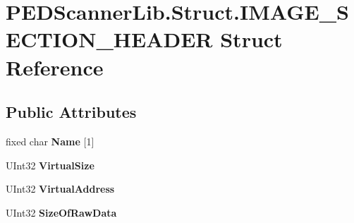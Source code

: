\hypertarget{struct_p_e_d_scanner_lib_1_1_struct_1_1_i_m_a_g_e___s_e_c_t_i_o_n___h_e_a_d_e_r}{}\section{P\+E\+D\+Scanner\+Lib.\+Struct.\+I\+M\+A\+G\+E\+\_\+\+S\+E\+C\+T\+I\+O\+N\+\_\+\+H\+E\+A\+D\+ER Struct Reference}
\label{struct_p_e_d_scanner_lib_1_1_struct_1_1_i_m_a_g_e___s_e_c_t_i_o_n___h_e_a_d_e_r}
\subsection*{Public Attributes}
\begin{DoxyCompactItemize}
\item 
\mbox{\label{struct_p_e_d_scanner_lib_1_1_struct_1_1_i_m_a_g_e___s_e_c_t_i_o_n___h_e_a_d_e_r_a9f933d8f37065ba73fbc2c2c24dd5047}} 
fixed char {\bfseries Name} \mbox{[}1\mbox{]}
\item 
\mbox{\label{struct_p_e_d_scanner_lib_1_1_struct_1_1_i_m_a_g_e___s_e_c_t_i_o_n___h_e_a_d_e_r_a19da337feea2d9ccecb0bf07d1e53c06}} 
U\+Int32 {\bfseries Virtual\+Size}
\item 
\mbox{\label{struct_p_e_d_scanner_lib_1_1_struct_1_1_i_m_a_g_e___s_e_c_t_i_o_n___h_e_a_d_e_r_a58328133dda1eac01b986943c3f85c69}} 
U\+Int32 {\bfseries Virtual\+Address}
\item 
\mbox{\label{struct_p_e_d_scanner_lib_1_1_struct_1_1_i_m_a_g_e___s_e_c_t_i_o_n___h_e_a_d_e_r_a210cb3d73466a04dd1f2d2d0158d4ae4}} 
U\+Int32 {\bfseries Size\+Of\+Raw\+Data}
\item 
\mbox{\label{struct_p_e_d_scanner_lib_1_1_struct_1_1_i_m_a_g_e___s_e_c_t_i_o_n___h_e_a_d_e_r_a64576844adce6c82c6c79ccd012d85d1}} 

\end{DoxyCompactItemize}
